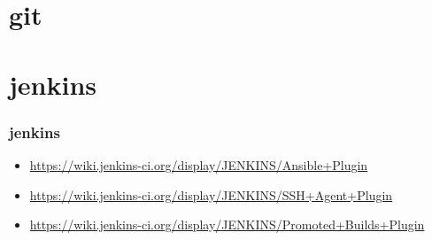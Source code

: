\documentclass{beamer}
\begin{document}
\section{git}

\begin{frame}

\end{frame}


\section{jenkins}

\begin{frame}
    \frametitle{jenkins}
    \footnotesize{
    \begin{itemize}
        \item \href{https://wiki.jenkins-ci.org/display/JENKINS/Ansible+Plugin}
                    {https://wiki.jenkins-ci.org/display/JENKINS/Ansible+Plugin}
        \item \href{https://wiki.jenkins-ci.org/display/JENKINS/SSH+Agent+Plugin}
                    {https://wiki.jenkins-ci.org/display/JENKINS/SSH+Agent+Plugin}
        \item \href{https://wiki.jenkins-ci.org/display/JENKINS/Promoted+Builds+Plugin}
                    {https://wiki.jenkins-ci.org/display/JENKINS/Promoted+Builds+Plugin}
    \end{itemize}
    }
\end{frame}
\end{document}
